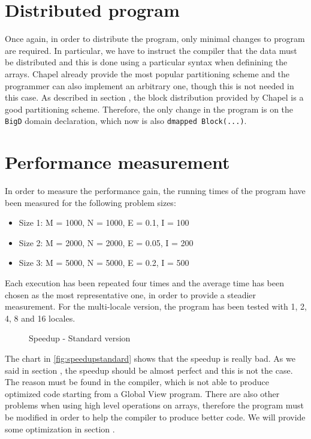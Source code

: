 \documentclass{article}
\begin{document}
\section{Distributed program}
Once again, in order to distribute the program, only minimal changes to program are required. In particular, we have to instruct the compiler that the data must be distributed and this is done using a particular syntax when definining the arrays. Chapel already provide the most popular partitioning scheme and the programmer can also implement an arbitrary one, though this is not needed in this case. As described in section , the block distribution provided by Chapel is a good partitioning scheme. Therefore, the only change in the program is on the \texttt{BigD} domain declaration, which now is also \texttt{dmapped Block(...)}.

\section{Performance measurement}
In order to measure the performance gain, the running times of the program have been measured for the following problem sizes:
\begin{itemize}
    \item Size 1: M = 1000, N = 1000, E = 0.1, I = 100
    \item Size 2: M = 2000, N = 2000, E = 0.05, I = 200
    \item Size 3: M = 5000, N = 5000, E = 0.2, I = 500
\end{itemize}
Each execution has been repeated four times and the average time has been chosen as the most representative one, in order to provide a steadier measurement. For the multi-locale version, the program has been tested with 1, 2, 4, 8 and 16 locales.
\begin{figure}
\centering
{}
\caption{Speedup - Standard version}
\label{fig:speedupstandard}
\end{figure}
The chart in \autoref{fig:speedupstandard} shows that the speedup is really bad. As we said in section , the speedup should be almost perfect and this is not the case. The reason must be found in the compiler, which is not able to produce optimized code starting from a Global View program. There are also other problems when using high level operations on arrays, therefore the program must be modified in order to help the compiler to produce better code. We will provide some optimization in section .
\end{document}

